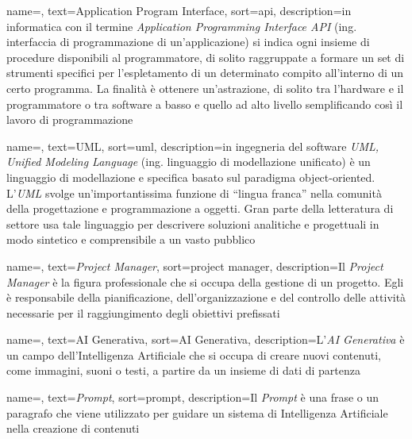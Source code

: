 


 {
    name=,
    text=Application Program Interface,
    sort=api,
    description={in informatica con il termine \emph{Application Programming Interface API} (ing. interfaccia di programmazione di un'applicazione) si indica ogni insieme di procedure disponibili al programmatore, di solito raggruppate a formare un set di strumenti specifici per l'espletamento di un determinato compito all'interno di un certo programma. La finalità è ottenere un'astrazione, di solito tra l'hardware e il programmatore o tra software a basso e quello ad alto livello semplificando così il lavoro di programmazione}
}

 {
    name=,
    text=UML,
    sort=uml,
    description={in ingegneria del software \emph{UML, Unified Modeling Language} (ing. linguaggio di modellazione unificato) è un linguaggio di modellazione e specifica basato sul paradigma object-oriented. L'\emph{UML} svolge un'importantissima funzione di ``lingua franca'' nella comunità della progettazione e programmazione a oggetti. Gran parte della letteratura di settore usa tale linguaggio per descrivere soluzioni analitiche e progettuali in modo sintetico e comprensibile a un vasto pubblico}
}


 {
    name=,
    text=\textit{Project Manager},
    sort=project manager,
    description={Il \emph{Project Manager} è la figura professionale che si occupa della gestione di un progetto. Egli è responsabile della pianificazione, dell'organizzazione e del controllo delle attività necessarie per il raggiungimento degli obiettivi prefissati}
}

 {
    name=,
    text=AI Generativa,
    sort=AI Generativa,
    description={L'\emph{AI Generativa} è un campo dell'Intelligenza Artificiale che si occupa di creare nuovi contenuti, come immagini, suoni o testi, a partire da un insieme di dati di partenza}
}

 {
    name=,
    text=\textit{Prompt},
    sort=prompt,
    description={Il \emph{Prompt} è una frase o un paragrafo che viene utilizzato per guidare un sistema di Intelligenza Artificiale nella creazione di contenuti}
}